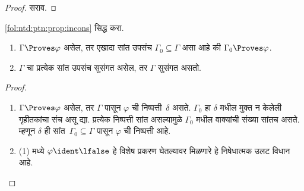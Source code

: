 \begin{proof}
सराव.
\end{proof}
\begin{prob}
\ref{fol:ntd:ptn:prop:incons} सिद्ध करा.
\end{prob}
\begin{prop}[संहतता]
  \label{fol:ntd:ptn:prop:proves-compact}
  \begin{enumerate}
  \item $\Gamma \Proves \varphi$ असेल, तर एखादा सांत उपसंच $\Gamma_0
    \subseteq \Gamma$ असा आहे की $\Gamma_0 \Proves \varphi$.
  \item $\Gamma$ चा प्रत्येक सांत उपसंच सुसंगत असेल, तर $\Gamma$ सुसंगत
    असतो.
  \end{enumerate}
\end{prop}
\begin{proof}
  \begin{enumerate}
    \item $\Gamma \Proves \varphi$ असेल, तर $\Gamma$ पासून $\varphi$ ची
      निष्पत्ती~$\delta$ असते. $\Gamma_0$ हा $\delta$ मधील
      मुक्त न केलेली गृहीतकांचा संच असू द्या. प्रत्येक निष्पत्ती सांत
      असल्यामुळे $\Gamma_0$ मधील वाक्यांची संख्या सांतच असते.
      म्हणून $\delta$ ही सांत~$\Gamma_0 \subseteq \Gamma$ पासून $\varphi$ ची
      निष्पत्ती आहे.
    \item (1) मध्ये $\varphi
      \ident \lfalse$ हे विशेष प्रकरण घेतल्यावर मिळणारे हे निषेधात्मक उलट
      विधान आहे.
  \end{enumerate}
\end{proof}
